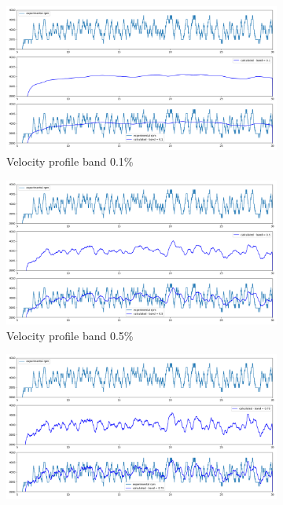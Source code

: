 \documentclass[10pt,fleqn,a4paper,twoside]{article}
\begin{document}
    \begin{figure}
        \centering
        \begin{subfigure}{0.4\textwidth}
            \includegraphics[width=\textwidth]{Figures/rpm_analysis_mic8_band_0.1.png}
            \caption{Velocity profile band 0.1\%}
            \label{fig:first}
        \end{subfigure}
        \hfill
        \centering
        \begin{subfigure}{0.4\textwidth}
            \includegraphics[width=\textwidth]{Figures/rpm_analysis_mic8_band_0.5.png}
            \caption{Velocity profile band 0.5\%}
            \label{fig:second}
        \end{subfigure}
        \hfill
        \centering
        \begin{subfigure}{0.4\textwidth}
            \includegraphics[width=\textwidth]{Figures/rpm_analysis_mic8_band_0.75.png}

\end{subfigure}
\end{figure}
\end{document}

